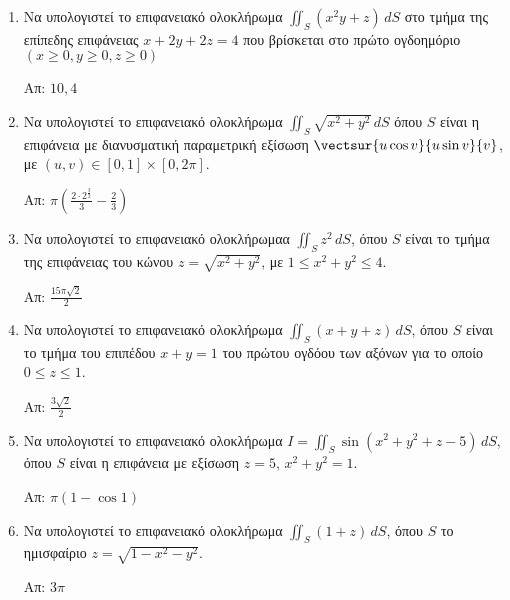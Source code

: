 






\thispagestyle{empty}

\begin{center}
\end{center}

\vspace{\baselineskip}

\begin{enumerate}

\item Να υπολογιστεί το επιφανειακό ολοκλήρωμα $\iint_{S}(x^{2}y+z)\,dS$ στο τμήμα της επίπεδης επιφάνειας $x+2y+2z=4$ που βρίσκεται στο πρώτο ογδοημόριο $(x\geq 0, y\geq 0, z\geq 0)$

\hfill Απ: $10,4$

\item Να υπολογιστεί το επιφανειακό ολοκλήρωμα $\iint_{S}\sqrt{x^{2}+y^{2}}\,dS$ όπου $S$ είναι η επιφάνεια με διανυσματική παραμετρική εξίσωση $\vectsur{u\cos v}{u\sin v}{v}$, με $(u,v)\in [0,1]\times[0,2\pi]$.

\hfill Απ: $\pi\left(\frac{2\cdot 2^{\frac{3}{2}}}{3}-\frac{2}{3}\right)$

\item Να υπολογιστεί το επιφανειακό ολοκλήρωμαα $\iint_{S}z^{2}\,dS$, όπου $S$ είναι το τμήμα της επιφάνειας του κώνου $z=\sqrt{x^{2}+y^{2}}$, με $1\leq x^{2}+y^{2}\leq 4$.

\hfill Απ: $\frac{15\pi\sqrt{2}}{2}$

\item Να υπολογιστεί το επιφανειακό ολοκλήρωμα $\iint_{S}(x+y+z)\,dS$, όπου $S$ είναι το τμήμα του επιπέδου $x+y=1$ του πρώτου ογδόου των αξόνων για το οποίο $0\leq z\leq 1$.

\hfill Απ: $\frac{3\sqrt{2}}{2}$

\item Να υπολογιστεί το επιφανειακό ολοκλήρωμα $I=\iint_{S}\sin(x^{2}+y^{2}+z-5)\,dS$, όπου $S$ είναι η επιφάνεια με εξίσωση $z=5$, $x^{2}+y^{2}=1$.

\hfill Απ: $\pi(1-\cos 1)$

\item Να υπολογιστεί το επιφανειακό ολοκλήρωμα $\iint_{S}(1+z)\,dS$, όπου $S$  το ημισφαίριο $z=\sqrt{1-x^{2}-y^{2}}$.

\hfill Απ: $3\pi$


\end{enumerate}
